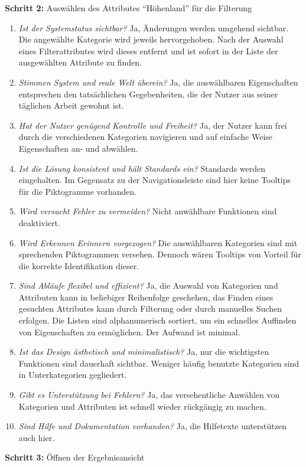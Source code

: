\textbf{Schritt 2:} Auswählen des Attributes \enquote{Höhenland} für die Filterung
\begin{enumerate}
 \item \textit{Ist der Systemstatus sichtbar?} Ja, Änderungen werden umgehend sichtbar. Die angewählte Kategorie wird jeweils hervorgehoben. Nach der Auswahl eines Filterattributes wird dieses entfernt und ist sofort in der Liste der ausgewählten Attribute zu finden.
 \item \textit{Stimmen System und reale Welt überein?} Ja, die auswählbaren Eigenschaften entsprechen den tatsächlichen Gegebenheiten, die der Nutzer aus seiner täglichen Arbeit gewohnt ist.
 \item \textit{Hat der Nutzer genügend Kontrolle und Freiheit?} Ja, der Nutzer kann frei durch die verschiedenen Kategorien navigieren und auf einfache Weise Eigenschaften an- und abwählen.
 \item \textit{Ist die Lösung konsistent und hält Standards ein?} Standards werden eingehalten. Im Gegensatz zu der Navigationsleiste sind hier keine Tooltips für die Piktogramme vorhanden.
 \item \textit{Wird versucht Fehler zu vermeiden?} Nicht anwählbare Funktionen sind deaktiviert.
 \item \textit{Wird Erkennen Erinnern vorgezogen?} Die auswählbaren Kategorien sind mit sprechenden Piktogrammen versehen. Dennoch wären Tooltips von Vorteil für die korrekte Identifikation dieser.
 \item \textit{Sind Abläufe flexibel und effizient?} Ja, die Auswahl von Kategorien und Attributen kann in beliebiger Reihenfolge geschehen, das Finden eines gesuchten Attributes kann durch Filterung oder durch manuelles Suchen erfolgen. Die Listen sind alphanumerisch sortiert, um ein schnelles Auffinden von Eigenschaften zu ermöglichen. Der Aufwand ist minimal.
 \item \textit{Ist das Design ästhetisch und minimalistisch?} Ja, nur die wichtigsten Funktionen sind dauerhaft sichtbar. Weniger häufig benutzte Kategorien sind in Unterkategorien gegliedert.
 \item \textit{Gibt es Unterstützung bei Fehlern?} Ja, das versehentliche Anwählen von Kategorien und Attributen ist schnell wieder rückgängig zu machen.
 \item \textit{Sind Hilfe und Dokumentation vorhanden?} Ja, die Hilfetexte unterstützen auch hier.
\end{enumerate}
\textbf{Schritt 3:} Öffnen der Ergebnisansicht
